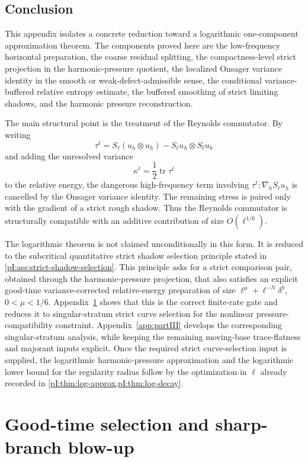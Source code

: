 \documentclass[11pt]{article}
\numberwithin{equation}{section}
\theoremstyle{plain}
\theoremstyle{definition}
\theoremstyle{remark}
\newcommand{\nabh}{\nabla_h}
\begin{document}
\subsection{Conclusion}

This appendix isolates a concrete reduction toward a logarithmic one-component approximation theorem.  The components proved here are the low-frequency horizontal preparation, the coarse residual splitting, the compactness-level strict projection in the harmonic-pressure quotient, the localized Onsager variance identity in the smooth or weak-defect-admissible sense, the conditional variance-buffered relative entropy estimate, the buffered smoothing of strict limiting shadows, and the harmonic pressure reconstruction.

The main structural point is the treatment of the Reynolds commutator.  By writing
\[
        \tau^\ell=S_\ell(u_h\otimes u_h)-S_\ell u_h\otimes S_\ell u_h
\]
and adding the unresolved variance
\[
        \kappa^\ell=\frac12\operatorname{tr}\tau^\ell
\]
to the relative energy, the dangerous high-frequency term involving \(\tau^\ell:\nabh S_\ell u_h\) is cancelled by the Onsager variance identity.  The remaining stress is paired only with the gradient of a strict rough shadow.  Thus the Reynolds commutator is structurally compatible with an additive contribution of size \(O(\ell^{1/6})\).

The logarithmic theorem is not claimed unconditionally in this form.  It is reduced to the subcritical quantitative strict shadow selection principle stated in \cref{pI:ass:strict-shadow-selection}.  This principle asks for a strict comparison pair, obtained through the harmonic-pressure projection, that also satisfies an explicit good-time variance-corrected relative-energy preparation of size \(\ell^\mu+\ell^{-N}\delta^b\), \(0<\mu<1/6\).  Appendix~\ref{app:partII} shows that this is the correct finite-rate gate and reduces it to singular-stratum strict curve selection for the nonlinear pressure-compatibility constraint.  Appendix~\ref{app:partIII} develops the corresponding singular-stratum analysis, while keeping the remaining moving-base trace-flatness and majorant inputs explicit.  Once the required strict curve-selection input is supplied, the logarithmic harmonic-pressure approximation and the logarithmic lower bound for the regularity radius follow by the optimization in \(\ell\) already recorded in \cref{pI:thm:log-approx,pI:thm:log-decay}.

\section{Good-time selection and sharp-branch blow-up}\label{app:partII}
\end{document}

